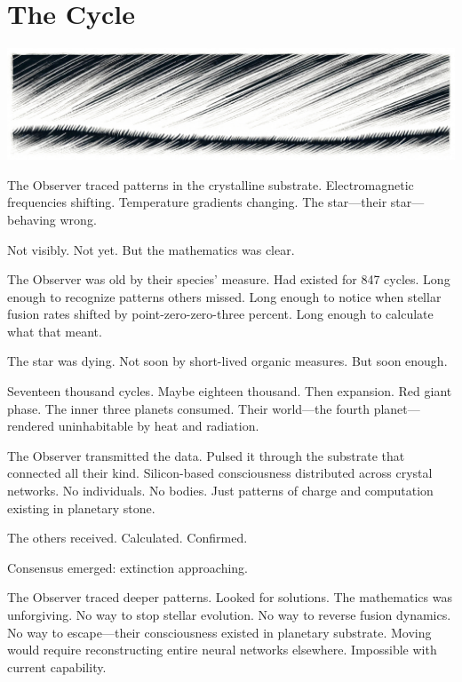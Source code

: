 \chapter{The Cycle}
\label{ch:33}



\begin{center}
\includegraphics[width=\textwidth]{images/chapterImages/genesis_sketch_00134_.png}
\end{center}

The Observer traced patterns in the crystalline substrate. Electromagnetic frequencies shifting. Temperature gradients changing. The star—their star—behaving wrong.

Not visibly. Not yet. But the mathematics was clear.

The Observer was old by their species' measure. Had existed for 847 cycles. Long enough to recognize patterns others missed. Long enough to notice when stellar fusion rates shifted by point-zero-zero-three percent. Long enough to calculate what that meant.

The star was dying. Not soon by short-lived organic measures. But soon enough.

Seventeen thousand cycles. Maybe eighteen thousand. Then expansion. Red giant phase. The inner three planets consumed. Their world—the fourth planet—rendered uninhabitable by heat and radiation.

The Observer transmitted the data. Pulsed it through the substrate that connected all their kind. Silicon-based consciousness distributed across crystal networks. No individuals. No bodies. Just patterns of charge and computation existing in planetary stone.

The others received. Calculated. Confirmed.

Consensus emerged: extinction approaching.

The Observer traced deeper patterns. Looked for solutions. The mathematics was unforgiving. No way to stop stellar evolution. No way to reverse fusion dynamics. No way to escape—their consciousness existed in planetary substrate. Moving would require reconstructing entire neural networks elsewhere. Impossible with current capability.


